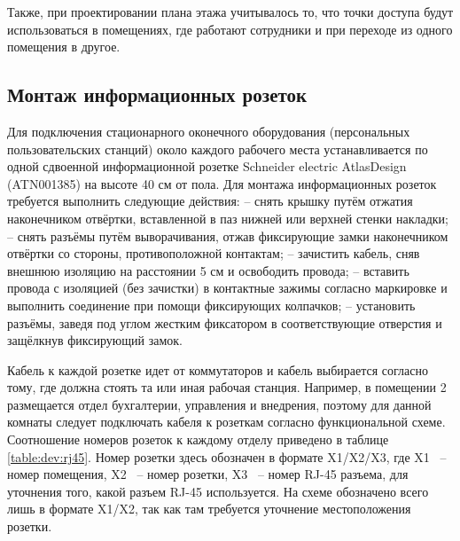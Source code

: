 Также, при проектировании плана этажа учитывалось то, что точки доступа будут использоваться в помещениях, где работают сотрудники
и при переходе из одного помещения в другое.

\subsection{Монтаж информационных розеток}

Для подключения стационарного оконечного оборудования (персональных пользовательских станций) около каждого рабочего места устанавливается 
по одной сдвоенной информационной розетке Schneider electric AtlasDesign (ATN001385) на высоте 40 см от пола. Для монтажа информационных розеток 
требуется выполнить следующие действия:
– снять крышку путём отжатия наконечником отвёртки, вставленной в паз нижней или верхней стенки накладки;
– снять разъёмы путём выворачивания, отжав фиксирующие замки наконечником отвёртки со стороны, противоположной контактам;
– зачистить кабель, сняв внешнюю изоляцию на расстоянии 5 см и освободить провода;
– вставить провода с изоляцией (без зачистки) в контактные зажимы согласно маркировке и выполнить соединение при помощи фиксирующих колпачков;
– установить разъёмы, заведя под углом жестким фиксатором в соответствующие отверстия и защёлкнув фиксирующий замок.

Кабель к каждой розетке идет от коммутаторов и кабель выбирается согласно тому, где должна стоять та или иная рабочая станция.
Например, в помещении 2 размещается отдел бухгалтерии, управления и внедрения, поэтому для данной комнаты следует подключать кабеля к розеткам 
согласно функциональной схеме. Соотношение номеров розеток к каждому отделу приведено в таблице \ref{table:dev:rj45}. Номер розетки 
здесь обозначен в формате X1/X2/X3, где X1 ~-- номер помещения, X2 ~-- номер розетки, X3 ~-- номер RJ-45 разъема, для уточнения того,
какой разъем RJ-45 используется. На схеме обозначено всего лишь в формате X1/X2, так как там требуется уточнение местоположения розетки.


